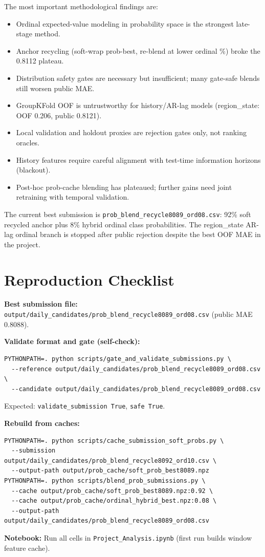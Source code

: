 \documentclass[12pt, a4paper]{article}
\begin{document}
The most important methodological findings are:
\begin{itemize}
    \item Ordinal expected-value modeling in probability space is the strongest late-stage method.
    \item Anchor recycling (soft-wrap prob-best, re-blend at lower ordinal \%) broke the 0.8112 plateau.
    \item Distribution safety gates are necessary but insufficient; many gate-safe blends still worsen public MAE.
    \item GroupKFold OOF is untrustworthy for history/AR-lag models (region\_state: OOF 0.206, public 0.8121).
    \item Local validation and holdout proxies are rejection gates only, not ranking oracles.
    \item History features require careful alignment with test-time information horizons (blackout).
    \item Post-hoc prob-cache blending has plateaued; further gains need joint retraining with temporal validation.
\end{itemize}

The current best submission is \texttt{prob\_blend\_recycle8089\_ord08.csv}: 92\% soft recycled anchor plus 8\% hybrid ordinal class probabilities. The region\_state AR-lag ordinal branch is stopped after public rejection despite the best OOF MAE in the project.

\appendix
\section{Reproduction Checklist}

\textbf{Best submission file:} \texttt{output/daily\_candidates/prob\_blend\_recycle8089\_ord08.csv} (public MAE 0.8088).

\textbf{Validate format and gate (self-check):}
\begin{verbatim}
PYTHONPATH=. python scripts/gate_and_validate_submissions.py \
  --reference output/daily_candidates/prob_blend_recycle8089_ord08.csv \
  --candidate output/daily_candidates/prob_blend_recycle8089_ord08.csv
\end{verbatim}
Expected: \texttt{validate\_submission True}, \texttt{safe True}.

\textbf{Rebuild from caches:}
\begin{verbatim}
PYTHONPATH=. python scripts/cache_submission_soft_probs.py \
  --submission output/daily_candidates/prob_blend_recycle8092_ord10.csv \
  --output-path output/prob_cache/soft_prob_best8089.npz
PYTHONPATH=. python scripts/blend_prob_submissions.py \
  --cache output/prob_cache/soft_prob_best8089.npz:0.92 \
  --cache output/prob_cache/ordinal_hybrid_best.npz:0.08 \
  --output-path output/daily_candidates/prob_blend_recycle8089_ord08.csv
\end{verbatim}

\textbf{Notebook:} Run all cells in \texttt{Project\_Analysis.ipynb} (first run builds window feature cache).
\end{document}
